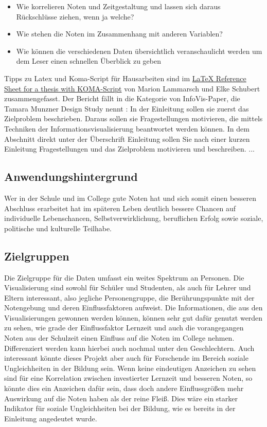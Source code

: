 \documentclass[usegeometry=true]{scrartcl}
\begin{document}
\begin{itemize}
\item Wie korrelieren Noten und Zeitgestaltung und lassen sich daraus Rückschlüsse ziehen, wenn ja welche? 
\item Wie stehen die Noten im Zusammenhang mit anderen Variablen?
\item Wie können die verschiedenen Daten übersichtlich veranschaulicht werden um dem Leser einen schnellen Überblick zu geben
\end{itemize}



Tipps zu Latex und Koma-Script für Hausarbeiten sind im \href{http://mirrors.ctan.org/info/latex-refsheet/LaTeX_RefSheet.pdf}{LaTeX Reference Sheet for a thesis with KOMA-Script} von Marion Lammarsch und Elke Schubert zusammengefasst. 
Der Bericht fällt in die Kategorie von InfoVis-Paper, die Tamara Munzner Design Study nennt \cite{Munzner2008}: In der Einleitung sollen sie zuerst das Zielproblem beschrieben. Daraus sollen sie Fragestellungen motivieren, die mittels Techniken der Informationsvisualisierung beantwortet werden können. In dem Abschnitt direkt unter der Überschrift Einleitung sollen Sie nach einer kurzen Einleitung Fragestellungen und das Zielproblem motivieren und beschreiben. ...

\subsection{Anwendungshintergrund}
Wer in der Schule und im College gute Noten hat und sich somit einen besseren Abschluss erarbeitet hat im späteren Leben deutlich bessere Chancen auf \glqq individuelle Lebenschancen, Selbstverwirklichung, beruflichen Erfolg sowie soziale, politische und kulturelle Teilhabe. \grqq





\subsection{Zielgruppen}
Die Zielgruppe für die Daten umfasst ein weites Spektrum an Personen. Die Visualisierung sind sowohl für Schüler und Studenten, als auch für Lehrer und Eltern interessant, also jegliche Personengruppe, die Berührungspunkte mit der Notengebung und deren Einflussfaktoren aufweist.
Die Informationen, die aus den Visualisierungen gewonnen werden können, können sehr gut dafür genutzt werden zu sehen, wie grade der Einflussfaktor Lernzeit und auch die vorangegangen Noten aus der Schulzeit einen Einfluss auf die Noten im College nehmen. Differenziert werden kann hierbei auch nochmal unter den Geschlechtern. 
Auch interessant könnte dieses Projekt aber auch für Forschende im Bereich soziale Ungleichheiten in der Bildung sein. Wenn keine eindeutigen Anzeichen zu sehen sind für eine Korrelation zwischen investierter Lernzeit und besseren Noten, so könnte dies ein Anzeichen dafür sein, dass doch andere Einflussgrößen mehr Auswirkung auf die Noten haben als der reine Fleiß. Dies wäre ein starker Indikator für soziale Ungleichheiten bei der Bildung, wie es bereits in der Einleitung angedeutet wurde. 
\end{document}
